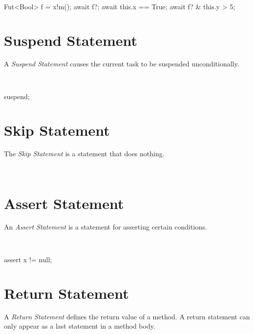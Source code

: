 \begin{absexample}
Fut<Bool> f = x!m();
await f?;
await this.x == True;
await f? & this.y > 5;
\end{absexample}

\section{Suspend Statement}
A \emph{Suspend Statement} causes the current task to be suspended unconditionally.

\begin{abssyntax}
  {}\ \TRS{;}
\end{abssyntax}

\begin{absexample}
suspend;
\end{absexample}

\section{Skip Statement}
The \emph{Skip Statement} is a statement that does nothing.

\begin{abssyntax}
  {}\ \TRS{;}
\end{abssyntax}

\section{Assert Statement}\label{sec:abs:assert}
An \emph{Assert Statement} is a statement for asserting certain conditions.

\begin{abssyntax}
  {}\ \ \TRS{;}
\end{abssyntax}

\begin{absexample}
assert x != null;
\end{absexample}

\section{Return Statement}
A \emph{Return Statement} defines the return value of a method.
A return statement can only appear as a last statement in a method body.

\begin{abssyntax}
  {}\ \ \TRS{;}
\end{abssyntax}


